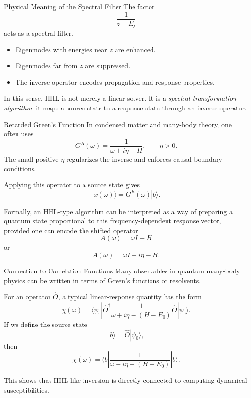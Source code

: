 \documentclass{beamer}
\begin{document}
\begin{frame}{Physical Meaning of the Spectral Filter}
  The factor
  \[
  \frac{1}{z-E_j}
  \]
  acts as a spectral filter.

  \begin{itemize}
  \item Eigenmodes with energies near \(z\) are enhanced.
  \item Eigenmodes far from \(z\) are suppressed.
  \item The inverse operator encodes propagation and response properties.
  \end{itemize}

  In this sense, HHL is not merely a linear solver. It is a \emph{spectral transformation algorithm}:
  it maps a source state to a response state through an inverse operator.
\end{frame}


\begin{frame}{Retarded Green's Function}
  In condensed matter and many-body theory, one often uses
  \[
  G^R(\omega) = \frac{1}{\omega + i\eta - H},
  \qquad \eta > 0.
  \]
  The small positive \(\eta\) regularizes the inverse and enforces causal boundary conditions.

  Applying this operator to a source state gives
  \[
  |x(\omega)\rangle = G^R(\omega)|b\rangle.
  \]

  Formally, an HHL-type algorithm can be interpreted as a way of preparing a quantum state proportional to this frequency-dependent response vector, provided one can encode the shifted operator
  \[
  A(\omega) = \omega I - H
  \]
  or
  \[
  A(\omega) = \omega I + i\eta - H.
  \]
\end{frame}


\begin{frame}{Connection to Correlation Functions}
  Many observables in quantum many-body physics can be written in terms of Green's functions or resolvents.

  For an operator \(\hat{O}\), a typical linear-response quantity has the form
  \[
  \chi(\omega)
  =
  \langle \psi_0 |
  \hat{O}^\dagger
  \frac{1}{\omega + i\eta - (H-E_0)}
  \hat{O}
  |\psi_0\rangle.
  \]
  If we define the source state
  \[
  |b\rangle = \hat{O}|\psi_0\rangle,
  \]
  then
  \[
  \chi(\omega)
  =
  \langle b|
  \frac{1}{\omega + i\eta - (H-E_0)}
  |b\rangle.
  \]

  This shows that HHL-like inversion is directly connected to computing dynamical susceptibilities.
\end{frame}
\end{document}
